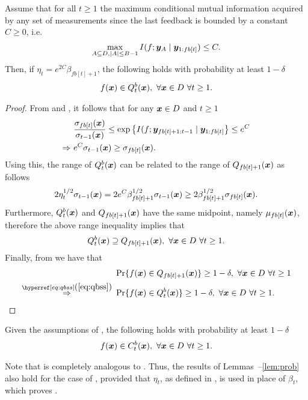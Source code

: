 \begin{lemma}
\label{lem:batch}
Assume that for all $t \geq 1$ the maximum conditional mutual information
acquired by any set of measurements since the last feedback is bounded
by a constant $C \geq 0$, i.e.
\begin{align}
\label{eq:cmi}
\max_{A\subseteq D, |A|\leq B-1} I(f; \bm{y}_A \mid \bm{y}_{1:fb[t]}) \leq C.
\end{align}
Then, if $\eta_t = e^{2C}\beta_{fb[t]+1}$, the following holds with probability
at least $1 - \delta$
\begin{align*}
f(\bm{x}) \in Q_t^{b}(\bm{x}),\ \forall \bm{x} \in D\ \forall t \geq 1.
\end{align*}
\end{lemma}
\begin{proof}
From  and , it follows that for any
$\bm{x} \in D$ and $t \geq 1$
\begin{align*}
&\frac{\sigma_{fb[t]}(\bm{x})}{\sigma_{t-1}(\bm{x})} \leq \exp\left\{I(f; \bm{y}_{fb[t]+1:t-1} \mid \bm{y}_{1:fb[t]}\right\} \leq e^C\\
\Rightarrow\ & e^C \sigma_{t-1}(\bm{x}) \geq \sigma_{fb[t]}(\bm{x}).
\end{align*}
Using this, the range of $Q_t^{b}(\bm{x})$ can be related to the range
of $Q_{fb[t]+1}(\bm{x})$ as follows
\begin{align*}
2\eta_t^{1/2}\sigma_{t-1}(\bm{x}) = 2 e^C \beta_{fb[t]+1}^{1/2}\sigma_{t-1}(\bm{x}) \geq 2\beta_{fb[t]+1}^{1/2}\sigma_{fb[t]}(\bm{x}).
\end{align*}
Furthermore, $Q_t^{b}(\bm{x})$ and $Q_{fb[t]+1}(\bm{x})$ have the same midpoint,
namely $\mu_{fb[t]}(\bm{x})$, therefore the above range inequality implies that
\begin{align}
\label{eq:qbss}
Q_t^{b}(\bm{x}) \supseteq Q_{fb[t]+1}(\bm{x}),\ \forall \bm{x} \in D\ \forall t \geq 1.
\end{align}
Finally, from  we have that
\begin{align*}
&\Pr\{f(\*x) \in Q_{fb[t]+1}(\*x)\} \geq 1 - \delta,\ \forall \*x \in D\ \forall t \geq 1\\
\stackrel{\eqtref{eq:qbss}}{\Rightarrow}\ & \Pr\{f(\*x) \in Q_t^{b}(\*x)\} \geq 1 - \delta,\ \forall \*x \in D\ \forall t \geq 1.
\end{align*}
\end{proof}

\begin{cor}
\label{cor:batch}
Given the assumptions of , the following holds with
probability at least $1-\delta$
\begin{align*}
f(\bm{x}) \in C_t^{b}(\bm{x}),\ \forall \bm{x} \in D\ \forall t \geq 1.
\end{align*}
\end{cor}

\noindent Note that  is completely analogous to .
Thus, the results of Lemmas~--\ref{lem:prob} also hold for
the case of \bacl, provided that $\eta_t$, as defined in ,
is used in place of $\beta_t$, which proves .